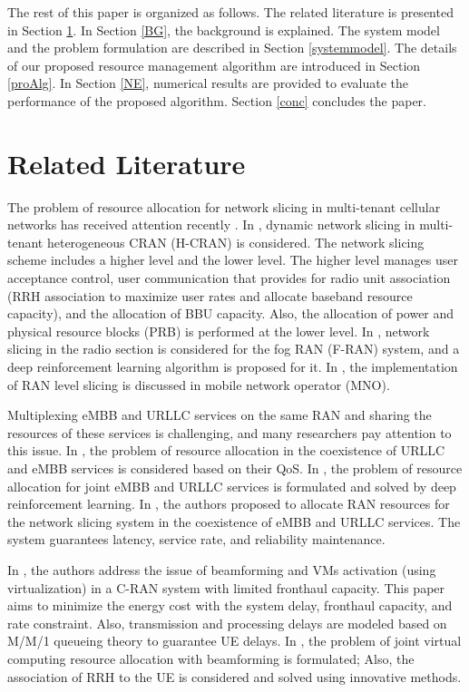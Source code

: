 \documentclass[lettersize,journal]{IEEEtran}
\begin{document}
The rest of this paper is organized as follows. The related literature is presented in Section \ref{RL}. In Section \ref{BG}, the background is explained.
The system model and the problem formulation are described in Section \ref{systemmodel}. The details of our proposed resource management algorithm are introduced in Section \ref{proAlg}. In Section \ref{NE}, numerical results are provided to evaluate the performance of the proposed algorithm. Section \ref{conc} concludes the paper.

\section{Related Literature}\label{RL}
The problem of resource allocation for network slicing in multi-tenant cellular networks has received attention recently \cite{feng2020dynamic,lee2018dynamic,lee2016new}.
In \cite{lee2018dynamic}, dynamic network slicing in multi-tenant heterogeneous CRAN (H-CRAN) is considered. The network slicing scheme includes a higher level and the lower level. The higher level manages user acceptance control, user communication that provides for radio unit association (RRH association to maximize user rates and allocate baseband resource capacity), and the allocation of BBU capacity. Also, the allocation of power and physical resource blocks (PRB) is performed at the lower level.
In \cite{xiang2020realization}, network slicing in the radio section is considered for the fog RAN (F-RAN) system, and a deep reinforcement learning algorithm is proposed for it. In \cite{elayoubi20195g,d2020toward}, the implementation of RAN level slicing is discussed in mobile network operator (MNO).

Multiplexing eMBB and URLLC services on the same RAN and sharing the resources of these services is challenging, and many researchers pay attention to this issue.
In \cite{setayesh2020joint,yang2020should,saggese2021power}, the problem of resource allocation in the coexistence of URLLC and eMBB services is considered based on their QoS.
In \cite{alsenwi2021intelligent}, the problem of resource allocation for joint eMBB and URLLC services is formulated and solved by deep reinforcement learning.
 In \cite{korrai2020ran}, the authors proposed to allocate RAN resources for the network slicing system in the coexistence of eMBB and URLLC services. The system guarantees latency, service rate, and reliability maintenance.
 
In \cite{SystemCostMinimization,guo2016exploiting}, the authors address the issue of beamforming and VMs activation (using virtualization) in a C-RAN system with limited fronthaul capacity.
This paper aims to minimize the energy cost with the system delay, fronthaul capacity, and rate constraint.
Also, transmission and processing delays are modeled based on M/M/1 queueing theory to guarantee UE delays.
In \cite{luong2018joint,luong2018novel}, the problem of joint virtual computing resource allocation with beamforming is formulated; Also, the association of RRH to the UE is considered and solved using innovative methods.
\end{document}
